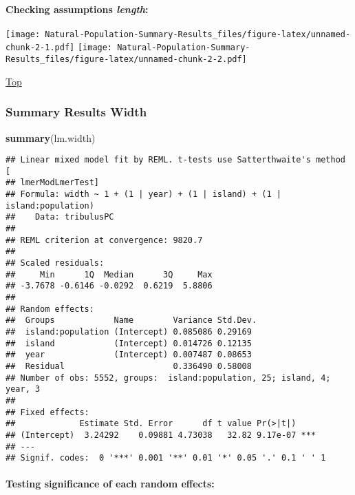 \documentclass[
]{article}
\newenvironment{Shaded}{\begin{snugshade}}{\end{snugshade}}
\newcommand{\KeywordTok}[1]{\textcolor[rgb]{0.13,0.29,0.53}{\textbf{#1}}}
\newcommand{\NormalTok}[1]{#1}
\begin{document}
\hypertarget{checking-assumptions-length}{%
\paragraph{\texorpdfstring{Checking assumptions
\emph{length}:}{Checking assumptions length:}}\label{checking-assumptions-length}}

\texttt{[image: Natural-Population-Summary-Results\_files/figure-latex/unnamed-chunk-2-1.pdf]}
\texttt{[image: Natural-Population-Summary-Results\_files/figure-latex/unnamed-chunk-2-2.pdf]}

\protect\hyperlink{generalized-linear-model}{Top}

\hypertarget{summary-results-width}{%
\subsubsection{Summary Results Width}\label{summary-results-width}}

\begin{Shaded}
\begin{Highlighting}[]
\KeywordTok{summary}\NormalTok{(lm.width)}
\end{Highlighting}
\end{Shaded}

\begin{verbatim}
## Linear mixed model fit by REML. t-tests use Satterthwaite's method [
## lmerModLmerTest]
## Formula: width ~ 1 + (1 | year) + (1 | island) + (1 | island:population)
##    Data: tribulusPC
## 
## REML criterion at convergence: 9820.7
## 
## Scaled residuals: 
##     Min      1Q  Median      3Q     Max 
## -3.7678 -0.6146 -0.0292  0.6219  5.8806 
## 
## Random effects:
##  Groups            Name        Variance Std.Dev.
##  island:population (Intercept) 0.085086 0.29169 
##  island            (Intercept) 0.014726 0.12135 
##  year              (Intercept) 0.007487 0.08653 
##  Residual                      0.336490 0.58008 
## Number of obs: 5552, groups:  island:population, 25; island, 4; year, 3
## 
## Fixed effects:
##             Estimate Std. Error      df t value Pr(>|t|)    
## (Intercept)  3.24292    0.09881 4.73038   32.82 9.17e-07 ***
## ---
## Signif. codes:  0 '***' 0.001 '**' 0.01 '*' 0.05 '.' 0.1 ' ' 1
\end{verbatim}

\hypertarget{testing-significance-of-each-random-effects-1}{%
\paragraph{Testing significance of each random
effects:}\label{testing-significance-of-each-random-effects-1}}
\end{document}
